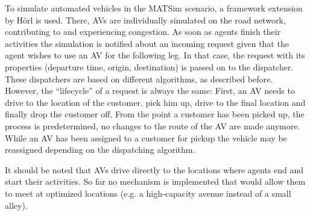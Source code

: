 To simulate automated vehicles in the MATSim scenario, a framework extension by Hörl \cite{horl_abmtrans17} is used. There, AVs are individually simulated on the road network, contributing to and experiencing congestion. As soon as agents finish their activities the simulation is notified about an incoming request given that the agent wishes to use an AV for the following leg. In that case, the request with its properties (departure time, origin, destination) is passed on to the dispatcher. These dispatchers are based on different algorithms, as described before. However, the ``lifecycle'' of a request is always the same: First, an AV needs to drive to the location of the customer, pick him up, drive to the final location and finally drop the customer off. From the point a customer has
been picked up, the process is predetermined, no changes to the route of the AV are made anymore. While an AV has been assigned to a customer for pickup the vehicle may be reassigned depending on the dispatching algorithm.

It should be noted that AVs drive directly to the locations where agents end and start their activities. So far no mechanism is implemented that would allow them to meet at optimized locations (e.g. a high-capacity avenue instead of a small alley).
